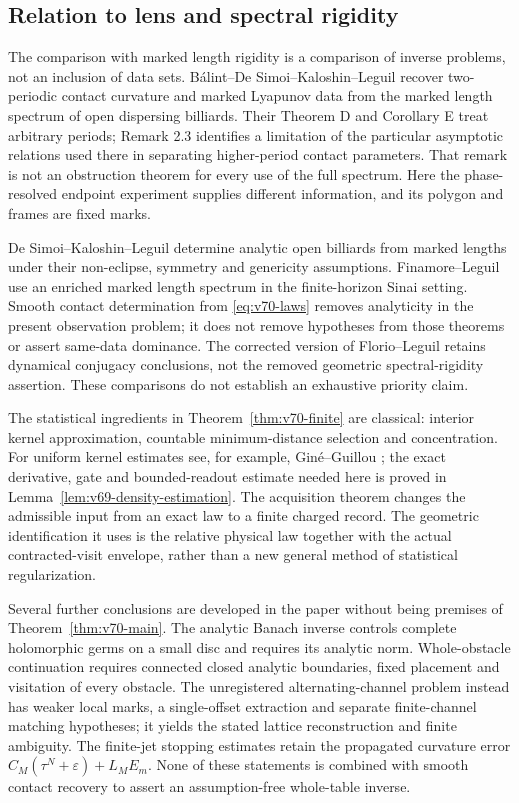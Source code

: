 \subsection{Relation to lens and spectral rigidity}



The comparison with marked length rigidity is a comparison of inverse
problems, not an inclusion of data sets.  B\'alint--De Simoi--Kaloshin--Leguil
\cite{BDKL} recover two-periodic contact curvature and marked Lyapunov
data from the marked length spectrum of open dispersing billiards.
Their Theorem D and Corollary E treat arbitrary periods; Remark 2.3
identifies a limitation of the particular asymptotic relations used
there in separating higher-period contact parameters.  That remark is
not an obstruction theorem for every use of the full spectrum.  Here
the phase-resolved endpoint experiment supplies different information,
and its polygon and frames are fixed marks.

De Simoi--Kaloshin--Leguil \cite{DSKL} determine analytic open billiards
from marked lengths under their non-eclipse, symmetry and genericity
assumptions.  Finamore--Leguil \cite{FinamoreLeguil} use an enriched
marked length spectrum in the finite-horizon Sinai setting.  Smooth
contact determination from \eqref{eq:v70-laws} removes analyticity
in the present observation problem; it does not remove hypotheses
from those theorems or assert same-data dominance.  The corrected
version of Florio--Leguil \cite{FlorioLeguil} retains dynamical
conjugacy conclusions, not the removed geometric spectral-rigidity
assertion.  These comparisons do not establish an exhaustive priority
claim.

The statistical ingredients in Theorem~\ref{thm:v70-finite} are classical:
interior kernel approximation, countable minimum-distance selection and
concentration.  For uniform kernel estimates see, for example,
Gin\'e--Guillou \cite{GineGuillou2002}; the exact derivative, gate and
bounded-readout estimate needed here is proved in
Lemma~\ref{lem:v69-density-estimation}.  The acquisition theorem changes
the admissible input from an exact law to a finite charged record.  The
geometric identification it uses is the relative physical law together
with the actual contracted-visit envelope, rather than a new general
method of statistical regularization.

Several further conclusions are developed in the paper without being
premises of Theorem~\ref{thm:v70-main}.  The analytic Banach inverse
controls complete holomorphic germs on a small disc and requires its
analytic norm.  Whole-obstacle continuation requires connected closed
analytic boundaries, fixed placement and visitation of every obstacle.
The unregistered alternating-channel problem instead has weaker local
marks, a single-offset extraction and separate finite-channel matching
hypotheses; it yields the stated lattice reconstruction and finite
ambiguity.  The finite-jet stopping estimates retain the propagated
curvature error $C_M(\tau^N+\varepsilon)+L_ME_m$.  None of these
statements is combined with smooth contact recovery to assert an
assumption-free whole-table inverse.

